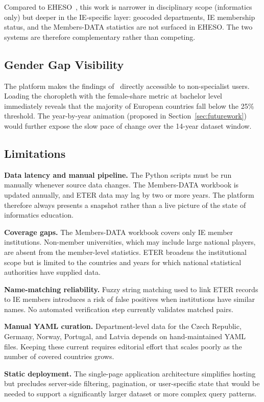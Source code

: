 \documentclass[final,3p,times,twocolumn]{elsarticle}
\begin{document}
Compared to EHESO~\cite{Lepori2023}, this work is narrower in disciplinary scope (informatics only) but deeper in the IE-specific layer: geocoded departments, IE membership status, and the Members-DATA statistics are not surfaced in EHESO. The two systems are therefore complementary rather than competing.

\subsection{Gender Gap Visibility}

The platform makes the findings of~\cite{DAngelo2024} directly accessible to non-specialist users. Loading the choropleth with the female-share metric at bachelor level immediately reveals that the majority of European countries fall below the 25\% threshold. The year-by-year animation (proposed in Section~\ref{sec:futurework}) would further expose the slow pace of change over the 14-year dataset window.

\subsection{Limitations}

\textbf{Data latency and manual pipeline.} The Python scripts must be run manually whenever source data changes. The Members-DATA workbook is updated annually, and ETER data may lag by two or more years. The platform therefore always presents a snapshot rather than a live picture of the state of informatics education.

\textbf{Coverage gaps.} The Members-DATA workbook covers only IE member institutions. Non-member universities, which may include large national players, are absent from the member-level statistics. ETER broadens the institutional scope but is limited to the countries and years for which national statistical authorities have supplied data.

\textbf{Name-matching reliability.} Fuzzy string matching used to link ETER records to IE members introduces a risk of false positives when institutions have similar names. No automated verification step currently validates matched pairs.

\textbf{Manual YAML curation.} Department-level data for the Czech Republic, Germany, Norway, Portugal, and Latvia depends on hand-maintained YAML files. Keeping these current requires editorial effort that scales poorly as the number of covered countries grows.

\textbf{Static deployment.} The single-page application architecture simplifies hosting but precludes server-side filtering, pagination, or user-specific state that would be needed to support a significantly larger dataset or more complex query patterns.
\end{document}
